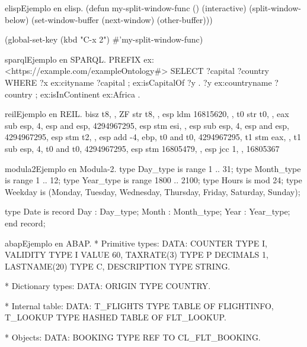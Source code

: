 \begin{sourcecode}{elisp}{Ejemplo en elisp.}
(defun my-split-window-func ()
  (interactive)
  (split-window-below)
  (set-window-buffer (next-window) (other-buffer)))

(global-set-key (kbd "C-x 2") #'my-split-window-func)
\end{sourcecode}

\begin{sourcecode}{sparql}{Ejemplo en SPARQL.}
PREFIX ex: <https://example.com/exampleOntology#>
SELECT ?capital
       ?country
WHERE
  {
    ?x  ex:cityname       ?capital   ;
        ex:isCapitalOf    ?y         .
    ?y  ex:countryname    ?country   ;
        ex:isInContinent  ex:Africa  .
  }
\end{sourcecode}


\begin{sourcecode}{reil}{Ejemplo en REIL.}
bisz t8, , ZF
str t8, , esp
ldm 16815620, , t0
str t0, , eax
sub esp, 4, esp
and esp, 4294967295, esp
stm esi, , esp
sub esp, 4, esp
and esp, 4294967295, esp
stm t2, , esp
add -4, ebp, t0
and t0, 4294967295, t1
stm eax, , t1
sub esp, 4, t0
and t0, 4294967295, esp
stm 16805479, , esp
jcc 1, , 16805367
\end{sourcecode}

\begin{sourcecode}{modula2}{Ejemplo en Modula-2.}
type Day_type   is range    1 ..   31;
type Month_type is range    1 ..   12;
type Year_type  is range 1800 .. 2100;
type Hours is mod 24;
type Weekday is (Monday, Tuesday, Wednesday, Thursday, Friday, Saturday, Sunday);

type Date is
   record
     Day   : Day_type;
     Month : Month_type;
     Year  : Year_type;
   end record;
\end{sourcecode}

\begin{sourcecode}{abap}{Ejemplo en ABAP.}
* Primitive types:
DATA: COUNTER      TYPE I,
      VALIDITY     TYPE I VALUE 60,
      TAXRATE(3)   TYPE P DECIMALS 1,
      LASTNAME(20) TYPE C,
      DESCRIPTION  TYPE STRING.

* Dictionary types:
DATA: ORIGIN       TYPE COUNTRY.

* Internal table:
DATA: T_FLIGHTS    TYPE TABLE OF FLIGHTINFO,
      T_LOOKUP     TYPE HASHED TABLE OF FLT_LOOKUP.

* Objects:
DATA: BOOKING      TYPE REF TO CL_FLT_BOOKING.
\end{sourcecode}

